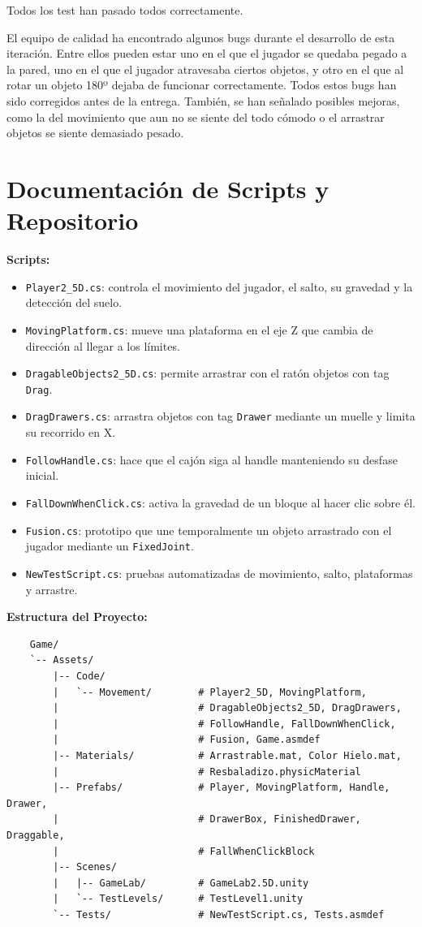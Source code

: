 \documentclass[12pt,twoside,letterpaper]{article}
\begin{document}
Todos los test han pasado todos correctamente.

El equipo de calidad ha encontrado algunos bugs durante el desarrollo de esta iteración. Entre ellos pueden estar uno en el que el jugador se quedaba pegado a la pared, uno en el que el jugador atravesaba ciertos objetos, y otro en el que al rotar un objeto 180º dejaba de funcionar correctamente. Todos estos bugs han sido corregidos antes de la entrega. También, se han señalado posibles mejoras, como la del movimiento que aun no se siente del todo cómodo o el arrastrar objetos se siente demasiado pesado.

\section{Documentación de Scripts y Repositorio}
\textbf{Scripts:}
\begin{itemize}
    \item \texttt{Player2\_5D.cs}: controla el movimiento del jugador, el salto, su gravedad y la detección del suelo.
    \item \texttt{MovingPlatform.cs}: mueve una plataforma en el eje Z que cambia de dirección al llegar a los límites.
    \item \texttt{DragableObjects2\_5D.cs}: permite arrastrar con el ratón objetos con tag \texttt{Drag}.
    \item \texttt{DragDrawers.cs}: arrastra objetos con tag \texttt{Drawer} mediante un muelle y limita su recorrido en X.
    \item \texttt{FollowHandle.cs}: hace que el cajón siga al handle manteniendo su desfase inicial.
    \item \texttt{FallDownWhenClick.cs}: activa la gravedad de un bloque al hacer clic sobre él.
    \item \texttt{Fusion.cs}: prototipo que une temporalmente un objeto arrastrado con el jugador mediante un \texttt{FixedJoint}.
    \item \texttt{NewTestScript.cs}: pruebas automatizadas de movimiento, salto, plataformas y arrastre.
\end{itemize}


\textbf{Estructura del Proyecto:}
\begin{verbatim}
    Game/
    `-- Assets/
        |-- Code/
        |   `-- Movement/        # Player2_5D, MovingPlatform,
        |                        # DragableObjects2_5D, DragDrawers,
        |                        # FollowHandle, FallDownWhenClick,
        |                        # Fusion, Game.asmdef
        |-- Materials/           # Arrastrable.mat, Color Hielo.mat,
        |                        # Resbaladizo.physicMaterial
        |-- Prefabs/             # Player, MovingPlatform, Handle, Drawer,
        |                        # DrawerBox, FinishedDrawer, Draggable,
        |                        # FallWhenClickBlock
        |-- Scenes/
        |   |-- GameLab/         # GameLab2.5D.unity
        |   `-- TestLevels/      # TestLevel1.unity
        `-- Tests/               # NewTestScript.cs, Tests.asmdef
\end{verbatim}
\end{document}

